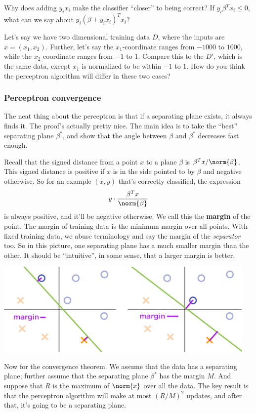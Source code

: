\documentclass[11pt,paper=letter]{scrartcl}
\begin{document}
\begin{exrboxed}
  Why does adding $y_ix_i$ make the classifier ``closer'' to being correct? If $y_i\beta^Tx_i \le 0$, what can we say about $y_i\left(\beta + y_ix_i\right)^Tx_i$?
\end{exrboxed}
\vspace{-1em}
\begin{exrboxed}
  Let's say we have two dimensional training data $D$, where the inputs are $x =(x_1, x_2)$. Further, let's say the $x_1$-coordinate ranges from $-1000$ to $1000$, while the $x_2$ coordinate ranges from $-1$ to $1$. Compare this to the $D'$, which is the same data, except $x_1$ is normalized to be within $-1$ to $1$. How do you think the perceptron algorithm will differ in these two cases?
\end{exrboxed}

\subsubsection*{Perceptron convergence}

The neat thing about the perceptron is that if a separating plane exists, it always finds it. The proof's actually pretty nice. The main idea is to take the ``best'' separating plane $\beta^*$, and show that the angle between $\beta$ and $\beta^*$ decreases fast enough.

Recall that the signed distance from a point $x$ to a plane $\beta$ is $\beta^Tx / \norm{\beta}$. This signed distance is positive if $x$ is in the side pointed to by $\beta$ and negative otherwise. So for an example $(x, y)$ that's correctly classified, the expression \[
  y \cdot \frac{\beta^Tx}{\norm{\beta}}
\]
is always positive, and it'll be negative otherwise. We call this the \textbf{margin} of the point. The margin of training data is the minimum margin over all points. With fixed training data, we abuse terminology and say the margin of the \textit{separator} too. So in this picture, one separating plane has a much smaller margin than the other. It should be ``intuitive'', in some sense, that a larger margin is better.
\begin{center}
  \includegraphics[height=1.8in]{12.png}
\end{center}
Now for the convergence theorem. We assume that the data has a separating plane; further assume that the separating plane $\beta^*$ has the margin $M$. And suppose that $R$ is the maximum of $\norm{x}$ over all the data. The key result is that the perceptron algorithm will make at most $(R / M)^2$ updates, and after that, it's going to be a separating plane.
\end{document}
